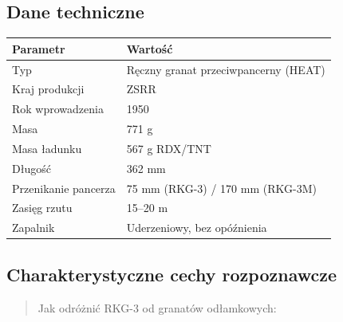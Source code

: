 \documentclass[12pt,oneside]{book}
\begin{document}
\subsection{Dane techniczne}\label{dane-techniczne-120}

\begin{longtable}[]{@{}ll@{}}
\toprule\noalign{}
Parametr & Wartość \\
\midrule\noalign{}
\endhead
\bottomrule\noalign{}
\endlastfoot
Typ & Ręczny granat przeciwpancerny (HEAT) \\
Kraj produkcji & ZSRR \\
Rok wprowadzenia & 1950 \\
Masa & 771 g \\
Masa ładunku & 567 g RDX/TNT \\
Długość & 362 mm \\
Przenikanie pancerza & 75 mm (RKG-3) / 170 mm (RKG-3M) \\
Zasięg rzutu & 15--20 m \\
Zapalnik & Uderzeniowy, bez opóźnienia \\
\end{longtable}

\subsection{Charakterystyczne cechy
rozpoznawcze}\label{charakterystyczne-cechy-rozpoznawcze-120}

\begin{quote}
Jak odróżnić RKG-3 od granatów odłamkowych:
\end{quote}
\end{document}
